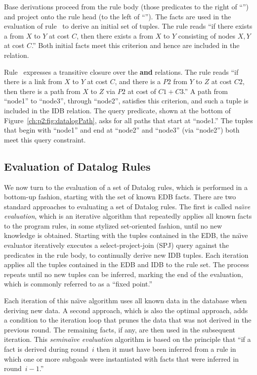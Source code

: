 Base derivations proceed from the rule body (those predicates to the right of
``\ol{:-}'') and project onto the rule head (to the left of ``\ol{:-}'').  The
 facts are used in the evaluation of rule~ to derive an initial
set of  tuples.  The rule reads ``if there exists a  from $X$
to $Y$ at cost $C$, then there exists a  from $X$ to $Y$ consisting of
nodes $X, Y$ at cost $C$.'' Both initial facts meet this criterion and hence
are included in the  relation.

Rule~ expresses a transitive closure over the  {\bf and}
 relations.  The rule reads ``if there is a link from $X$ to $Y$ at
cost $C$, and there is a  $P2$ from $Y$ to $Z$ at cost $C2$, then
there is a path from $X$ to $Z$ via $P2$ at cost of $C1+C3$.'' A path from
``node1'' to ``node3'', through ``node2'', satisfies this criterion, and such a
tuple is included in the  IDB relation.  The query predicate, shown at
the bottom of Figure~\ref{ch:p2:fig:datalogPath}, asks for all paths that start
at ``node1.'' The  tuples that begin with ``node1'' and end at
``node2'' and ``node3'' (via ``node2'') both meet this query constraint.

\subsection{Evaluation of Datalog Rules}
\label{ch:p2:sec:eval}

We now turn to the evaluation of a set of Datalog rules, which is performed in
a bottom-up fashion, starting with the set of known EDB facts.  There are two
standard approaches to evaluating a set of Datalog rules.  The first is called
{\em na\"{\i}ve evaluation}, which is an iterative algorithm that repeatedly
applies all known facts to the program rules, in some stylized set-oriented
fashion, until no new knowledge is obtained.  Starting with the tuples
contained in the EDB, the na\"{\i}ve evaluator iteratively executes a
select-project-join (SPJ) query against the predicates in the rule body, to
continually derive new IDB tuples.  Each iteration applies all the tuples
contained in the EDB and IDB to the rule set.  The process repeats until no new
tuples can be inferred, marking the end of the evaluation, which is commonly
referred to as a ``fixed point.''

Each iteration of this na\"{\i}ve algorithm uses all known data in the database
when deriving new data.  A second approach, which is also the optimal approach,
adds a condition to the iteration loop that prunes the data that was not
derived in the previous round.  The remaining facts, if any, are then used in
the subsequent iteration.  This {\em semina\"{\i}ve evaluation} algorithm is
based on the principle that ``if a fact is derived during round~$i$ then it
must have been inferred from a rule in which one or more subgoals were
instantiated with facts that were inferred in round~$i-1$.''~\cite{ullmanbook}


